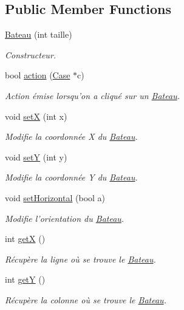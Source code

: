 \subsection*{Public Member Functions}
\begin{DoxyCompactItemize}
\item 
\hyperlink{classBateau_af9484dd811f8f678d92bfd70e2f1c5e2}{Bateau} (int taille)
\begin{DoxyCompactList}\small\item\em Constructeur. \end{DoxyCompactList}\item 
bool \hyperlink{classBateau_a3e54040953962f545b5fabadbcc330e8}{action} (\hyperlink{classCase}{Case} $\ast$c)
\begin{DoxyCompactList}\small\item\em Action émise lorsqu'on a cliqué sur un \hyperlink{classBateau}{Bateau}. \end{DoxyCompactList}\item 
void \hyperlink{classBateau_a12cc2226f5533d98b5b1f71fc042f1a6}{set\+X} (int x)
\begin{DoxyCompactList}\small\item\em Modifie la coordonnée X du \hyperlink{classBateau}{Bateau}. \end{DoxyCompactList}\item 
void \hyperlink{classBateau_ad84a941f5968a3690b80b12ca56547c4}{set\+Y} (int y)
\begin{DoxyCompactList}\small\item\em Modifie la coordonnée Y du \hyperlink{classBateau}{Bateau}. \end{DoxyCompactList}\item 
void \hyperlink{classBateau_a1dae1dbd3d3e0334a4dc5b43ef579c25}{set\+Horizontal} (bool a)
\begin{DoxyCompactList}\small\item\em Modifie l'orientation du \hyperlink{classBateau}{Bateau}. \end{DoxyCompactList}\item 
int \hyperlink{classBateau_ab7bd97ef05abea97c5322a16760b7d51}{get\+X} ()
\begin{DoxyCompactList}\small\item\em Récupère la ligne où se trouve le \hyperlink{classBateau}{Bateau}. \end{DoxyCompactList}\item 
int \hyperlink{classBateau_a178bb83641412590fcc39d8974d6562a}{get\+Y} ()
\begin{DoxyCompactList}\small\item\em Récupère la colonne où se trouve le \hyperlink{classBateau}{Bateau}. \end{DoxyCompactList}\item 

\end{DoxyCompactItemize}
